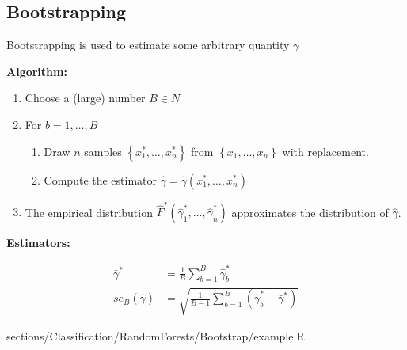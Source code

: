 \subsection{Bootstrapping}
 	\RTheory
 	{
 		Bootstrapping is used to estimate some arbitrary quantity $\gamma$
 		
 	    \textbf{Algorithm:}

		\begin{enumerate}
	    	\item Choose a (large) number $B \in N$
	    	\item For $b = 1,\dots,B$
	    		\begin{enumerate}
	    		    \item Draw $n$ samples $\left\{x_1^*,\dots,x_n^*\right\}$ from $\left\{x_1,\dots,x_n\right\}$ with replacement.
	    		    \item Compute the estimator $\hat{\gamma} = \hat{\gamma}(x_1^*,\dots,x_n^*)$
	    		\end{enumerate}
	    	\item The empirical distribution $\hat{F}^*(\hat{\gamma}_1^*,\dots,\hat{\gamma}_n^*)$ approximates the distribution of $\hat{\gamma}$.
		\end{enumerate}
		
		\textbf{Estimators:}
		
		$$\begin{aligned}
			\bar{\gamma}^* &= \frac{1}{B} \sum\limits_{b=1}^B \hat{\gamma}_b^*\\
			se_B(\hat{\gamma}) &= \sqrt{\frac{1}{B-1} \sum\limits_{b=1}^B (\hat{\gamma}_b^* - \bar{\gamma}^*)}
		\end{aligned}$$
	}
	{
		sections/Classification/RandomForests/Bootstrap/example.R
	}	
	
